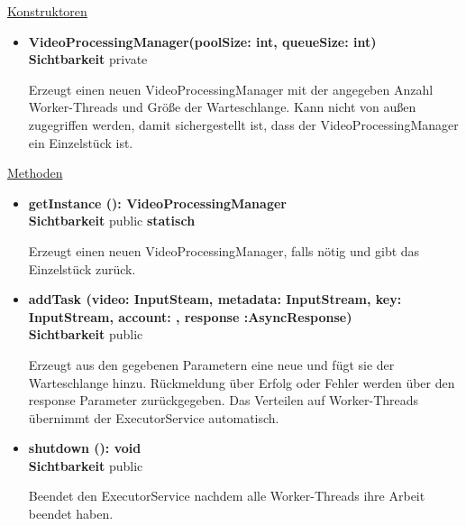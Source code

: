 \underline{Konstruktoren}
\begin{itemize}
\itemsep0pt
\item \textbf{VideoProcessingManager(poolSize: int, queueSize: int)} \hfill\\
\textbf{Sichtbarkeit} private

Erzeugt einen neuen VideoProcessingManager mit der angegeben Anzahl Worker-Threads und Größe der Warteschlange. Kann nicht von außen zugegriffen werden, damit sichergestellt ist, dass der VideoProcessingManager ein Einzelstück ist.
\end{itemize}

\underline{Methoden}
\begin{itemize}
\itemsep0pt
\item \textbf{getInstance (): VideoProcessingManager}\hfill\\
\textbf{Sichtbarkeit} public \newline
\textbf{statisch}

Erzeugt einen neuen VideoProcessingManager, falls nötig und gibt das Einzelstück zurück.

\item \textbf{addTask (video: InputSteam, metadata: InputStream, 
key: InputStream, account: , response :AsyncResponse)}\hfill\\
\textbf{Sichtbarkeit} public

Erzeugt aus den gegebenen Parametern eine neue  und fügt sie der Warteschlange hinzu. Rückmeldung über Erfolg oder Fehler werden über den response Parameter zurückgegeben. Das Verteilen auf Worker-Threads übernimmt der ExecutorService automatisch.

\item \textbf{shutdown (): void}\hfill\\
\textbf{Sichtbarkeit} public

Beendet den ExecutorService nachdem alle Worker-Threads ihre Arbeit beendet haben.
\end{itemize}